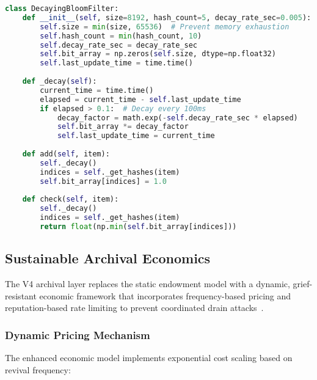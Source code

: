 \documentclass{article}
\begin{document}
\begin{lstlisting}[language=Python,caption={Fragmentation Detection System},label={lst:fragmentation}]
class DecayingBloomFilter:
    def __init__(self, size=8192, hash_count=5, decay_rate_sec=0.005):
        self.size = min(size, 65536)  # Prevent memory exhaustion
        self.hash_count = min(hash_count, 10)
        self.decay_rate_sec = decay_rate_sec
        self.bit_array = np.zeros(self.size, dtype=np.float32)
        self.last_update_time = time.time()
    
    def _decay(self):
        current_time = time.time()
        elapsed = current_time - self.last_update_time
        if elapsed > 0.1:  # Decay every 100ms
            decay_factor = math.exp(-self.decay_rate_sec * elapsed)
            self.bit_array *= decay_factor
            self.last_update_time = current_time
    
    def add(self, item):
        self._decay()
        indices = self._get_hashes(item)
        self.bit_array[indices] = 1.0
    
    def check(self, item):
        self._decay()
        indices = self._get_hashes(item)
        return float(np.min(self.bit_array[indices]))
\end{lstlisting}

\subsection{Sustainable Archival Economics}

The V4 archival layer replaces the static endowment model with a dynamic, grief-resistant economic framework that incorporates frequency-based pricing and reputation-based rate limiting to prevent coordinated drain attacks~\cite{douceur2002sybil}.

\subsubsection{Dynamic Pricing Mechanism}

The enhanced economic model implements exponential cost scaling based on revival frequency:
\end{document}
